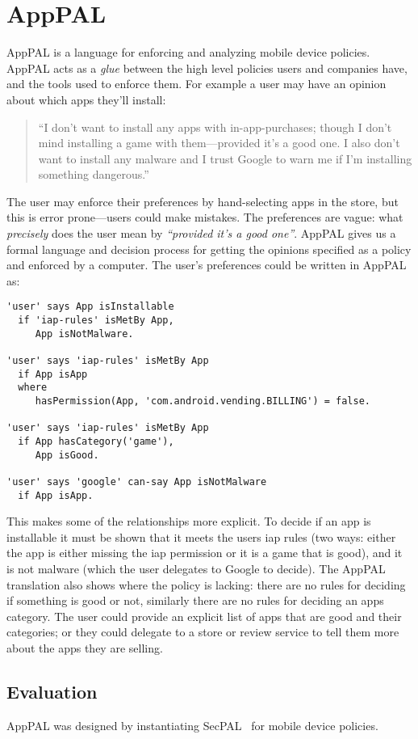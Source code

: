 \documentclass[thesis.tex]{subfiles}
\begin{document}
\chapter{AppPAL}

AppPAL is a language for enforcing and analyzing mobile device policies.
AppPAL acts as a \emph{glue} between the high level policies users and companies have, and the tools used to enforce them.
For example a user may have an opinion about which apps they'll install:

\begin{quotation}
  ``I don't want to install any apps with in-app-purchases;
    though I don't mind installing a game with them---provided it's a good one.
  I also don't want to install any malware and I trust Google to warn me if I'm installing something dangerous.''
\end{quotation}

The user may enforce their preferences by hand-selecting apps in the store, but this is error prone---users could make mistakes.
The preferences are vague: what \emph{precisely} does the user mean by \emph{``provided it's a good one''}.
AppPAL gives us a formal language and decision process for getting the opinions specified as a policy and enforced by a computer.
The user's preferences could be written in AppPAL as:

\begin{lstlisting}
'user' says App isInstallable 
  if 'iap-rules' isMetBy App,
     App isNotMalware.

'user' says 'iap-rules' isMetBy App 
  if App isApp 
  where
     hasPermission(App, 'com.android.vending.BILLING') = false.

'user' says 'iap-rules' isMetBy App 
  if App hasCategory('game'),
     App isGood.

'user' says 'google' can-say App isNotMalware 
  if App isApp.
\end{lstlisting}

This makes some of the relationships more explicit.
To decide if an app is installable it must be shown that it meets the users \ac{iap} rules (two ways: either the app is either missing the \ac{iap} permission or it is a game that is good), and it is not malware (which the user delegates to Google to decide). 
The AppPAL translation also shows where the policy is lacking:
    there are no rules for deciding if something is good or not,
    similarly there are no rules for deciding an apps category.
The user could provide an explicit list of apps that are good and their categories; or they could delegate to a store or review service to tell them more about the apps they are selling.

\section{Evaluation}

AppPAL was designed by instantiating SecPAL~\cite{Becker:2006vh} for mobile device policies.
\end{document}
